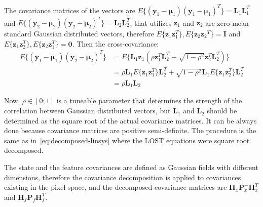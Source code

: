 The covariance matrices of the vectors are $E\{(\mathbf{y}_1-\boldsymbol{\mu}_1){(\mathbf{y}_1-\boldsymbol{\mu}_1)}^T\}=\mathbf{L}_1\mathbf{L}_1^T$ and $E\{(\mathbf{y}_2-\boldsymbol{\mu}_2){(\mathbf{y}_2-\boldsymbol{\mu}_2)}^T\}=\mathbf{L}_2\mathbf{L}_2^T$, that utilizes $\mathbf{z}_1$ and $\mathbf{z}_2$ are zero-mean standard Gaussian distributed vectors, therefore $E\{\mathbf{z}_1\mathbf{z}_1^T\}, E\{\mathbf{z}_2{\mathbf{z}_2}^T\}=\mathbf{I}$ and $E\{\mathbf{z}_1\mathbf{z}_2^T\}, E\{\mathbf{z}_2\mathbf{z}_1^T\}=\mathbf{0}$. Then the cross-covariance:
\begin{equation}
\begin{aligned}    
    E\{(\mathbf{y}_1-\boldsymbol{\mu}_1){(\mathbf{y}_2-\boldsymbol{\mu}_2)}^T\}&=E\{\mathbf{L}_1\mathbf{z}_1(\rho\mathbf{z}_1^T\mathbf{L}_2^T+\sqrt{1-\rho^2}\mathbf{z}_2^T\mathbf{L}_2^T)\} \\ &=
    \rho\mathbf{L}_1 E\{\mathbf{z}_1\mathbf{z}_1^T\}\mathbf{L}_2^T+\sqrt{1-\rho^2}\mathbf{L}_1E\{\mathbf{z}_1\mathbf{z}_2^T\}\mathbf{L}_2^T \\ &=
    \rho\mathbf{L}_1\mathbf{L}_2
\end{aligned}
\end{equation}

Now, $\rho\in[0;1]$ is a tuneable parameter that determines the strength of the correlation between Gaussian distributed vectors, but $\mathbf{L}_1$ and $\mathbf{L}_2$ should be determined as the square root of the actual covariance matrices. It can be always done because covariance matrices are positive semi-definite. The procedure is the same as in~\eqref{eq:decomposed-linsys} where the LOST equations were square root decomposed.

The state and the feature covariances are defined as Gaussian fields with different dimensions, therefore the covariance decomposition is applied to covariances existing in the pixel space, and the decomposed covariance matrices are $\mathbf{H}_x\mathbf{P}_x^-\mathbf{H}_x^T$ and $\mathbf{H}_f\mathbf{P}_f\mathbf{H}_f^T$.